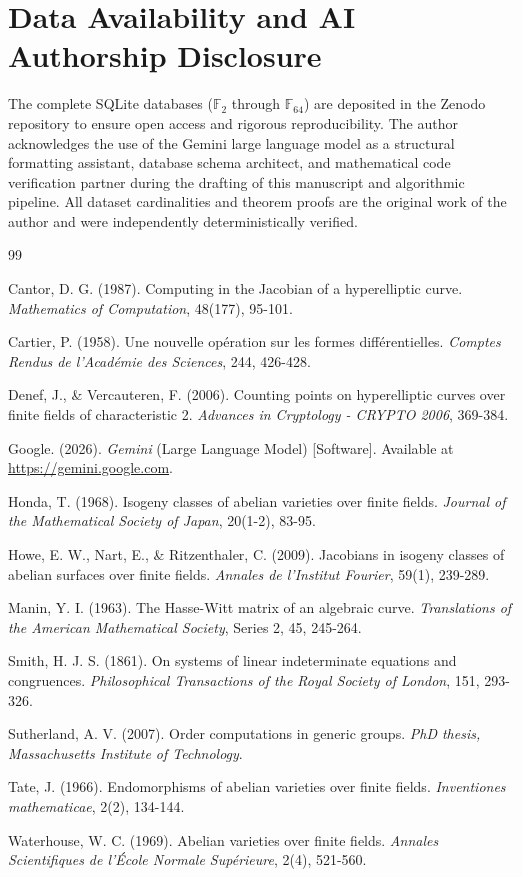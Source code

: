 \documentclass[letterpaper, 11pt]{article}
\begin{document}
\section{Data Availability and AI Authorship Disclosure}
The complete SQLite databases ($\mathbb{F}_{2}$ through $\mathbb{F}_{64}$) are deposited in the Zenodo repository to ensure open access and rigorous reproducibility. The author acknowledges the use of the Gemini large language model \cite{Gemini2026} as a structural formatting assistant, database schema architect, and mathematical code verification partner during the drafting of this manuscript and algorithmic pipeline. All dataset cardinalities and theorem proofs are the original work of the author and were independently deterministically verified.

\begin{thebibliography}{99}

Cantor, D. G. (1987). Computing in the Jacobian of a hyperelliptic curve. \textit{Mathematics of Computation}, 48(177), 95-101.

Cartier, P. (1958). Une nouvelle op\'{e}ration sur les formes diff\'{e}rentielles. \textit{Comptes Rendus de l'Acad\'{e}mie des Sciences}, 244, 426-428.

Denef, J., \& Vercauteren, F. (2006). Counting points on hyperelliptic curves over finite fields of characteristic 2. \textit{Advances in Cryptology - CRYPTO 2006}, 369-384.

Google. (2026). \textit{Gemini} (Large Language Model) [Software]. Available at \url{https://gemini.google.com}.

Honda, T. (1968). Isogeny classes of abelian varieties over finite fields. \textit{Journal of the Mathematical Society of Japan}, 20(1-2), 83-95.

Howe, E. W., Nart, E., \& Ritzenthaler, C. (2009). Jacobians in isogeny classes of abelian surfaces over finite fields. \textit{Annales de l'Institut Fourier}, 59(1), 239-289.

Manin, Y. I. (1963). The Hasse-Witt matrix of an algebraic curve. \textit{Translations of the American Mathematical Society}, Series 2, 45, 245-264.

Smith, H. J. S. (1861). On systems of linear indeterminate equations and congruences. \textit{Philosophical Transactions of the Royal Society of London}, 151, 293-326.

Sutherland, A. V. (2007). Order computations in generic groups. \textit{PhD thesis, Massachusetts Institute of Technology}.

Tate, J. (1966). Endomorphisms of abelian varieties over finite fields. \textit{Inventiones mathematicae}, 2(2), 134-144.

Waterhouse, W. C. (1969). Abelian varieties over finite fields. \textit{Annales Scientifiques de l'\'{E}cole Normale Sup\'{e}rieure}, 2(4), 521-560.

\end{thebibliography}
\end{document}

